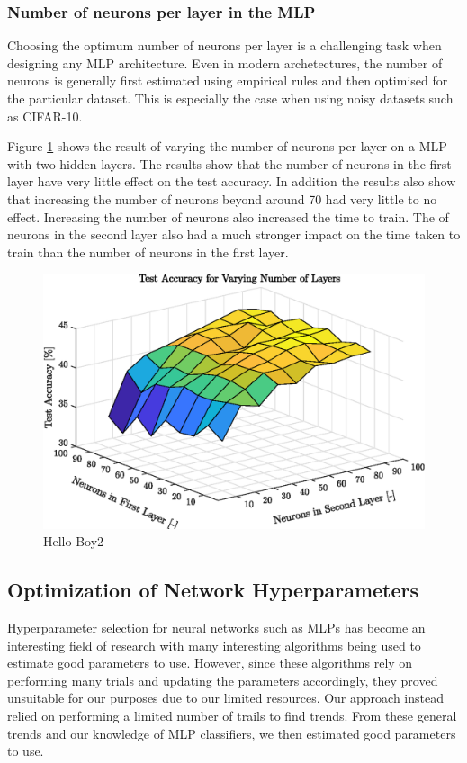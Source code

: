 \subsubsection{Number of neurons per layer in the MLP}

Choosing the optimum number of neurons per layer is a challenging task when designing any MLP architecture. Even in modern archetectures, the number of neurons is generally first estimated using empirical rules and then optimised for the particular dataset\cite{lawrence1998size}. This is especially the case when using noisy datasets such as CIFAR-10.

Figure \ref{fig:surfaceLayers} shows the result of varying the number of neurons per layer on a MLP with two hidden layers. The results show that the number of neurons in the first layer have very little effect on the test accuracy. In addition the results also show that increasing the number of neurons beyond around 70 had very little to no effect. Increasing the number of neurons also increased the time to train. The of neurons in the second layer also had a much stronger impact on the time taken to train than the number of neurons in the first layer. 

	\begin{figure}[h!]
   		 \centering
   		 \includegraphics{images/surfacelayers}
   		 \caption{Hello Boy2}
   		 \label{fig:surfaceLayers}
    \end{figure}

\FloatBarrier
\subsection{Optimization of Network Hyperparameters}\label{subsec:optNet}
Hyperparameter selection for neural networks such as MLPs has become an interesting field of research with many interesting algorithms being used to estimate good parameters to use\cite{bergstra2011algorithms}. However, since these algorithms rely on performing many trials and updating the parameters accordingly, they proved unsuitable for our purposes due to our limited resources. Our approach instead relied on performing a limited number of trails to find trends. From these general trends and our knowledge of MLP classifiers, we then estimated good parameters to use.


